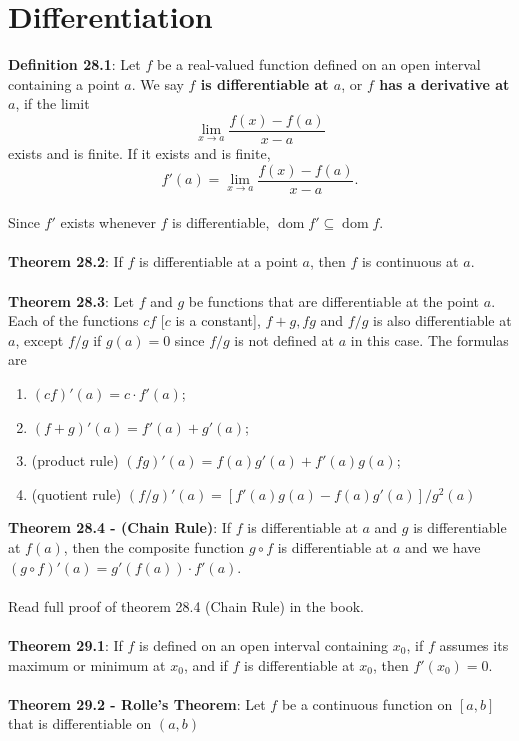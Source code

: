 \documentclass{article}
\theoremstyle{definition}
\DeclareMathOperator{\Dom}{dom}
\begin{document}
\section*{Differentiation}
\textbf{Definition 28.1}: Let $f$ be a real-valued function defined on an open interval containing a point $a$. We say \textbf{$f$ is differentiable at $a$}, or \textbf{$f$ has a derivative at $a$}, if the limit $$\lim_{x \rightarrow a} \frac{f(x) - f(a)}{x - a}$$ exists and is finite. If it exists and is finite, $$f'(a) = \lim_{x \rightarrow a} \frac{f(x) - f(a)}{x - a}.$$ \\
Since $f'$ exists whenever $f$ is differentiable, $\Dom{f'} \subseteq \Dom{f}$. \\ \\
\textbf{Theorem 28.2}: If $f$ is differentiable at a point $a$, then $f$ is continuous at $a$. \\ \\
\textbf{Theorem 28.3}: Let $f$ and $g$ be functions that are differentiable at the point $a$. Each of the functions $cf$ [$c$ is a constant], $f + g, fg$ and $f / g$ is also differentiable at $a$, except $f /g$ if $g(a) = 0$ since $f / g$ is not defined at $a$ in this case. The formulas are \begin{enumerate}
    \item $(cf)'(a) = c \cdot f'(a)$;
    \item $(f + g)'(a) = f'(a) + g'(a)$;
    \item (product rule) $(fg)'(a) = f(a)g'(a) + f'(a)g(a)$;
    \item (quotient rule) $(f/g)'(a) = [f'(a)g(a) - f(a)g'(a)]/g^2(a)$
\end{enumerate} $ $ \\
\textbf{Theorem 28.4 - (Chain Rule)}: If $f$ is differentiable at $a$ and $g$ is differentiable at $f(a)$, then the composite function $g \circ f$ is differentiable at $a$ and we have $(g \circ f)'(a) = g'(f(a)) \cdot f'(a)$. \\ \\
Read full proof of theorem 28.4 (Chain Rule) in the book. \\ \\
\textbf{Theorem 29.1}: If $f$ is defined on an open interval containing $x_0$, if $f$ assumes its maximum or minimum at $x_0$, and if $f$ is differentiable at $x_0$, then $f'(x_0) = 0$. \\ \\
\textbf{Theorem 29.2 - Rolle's Theorem}: Let $f$ be a continuous function on $[a, b]$ that is differentiable on $(a, b)$
\end{document}
